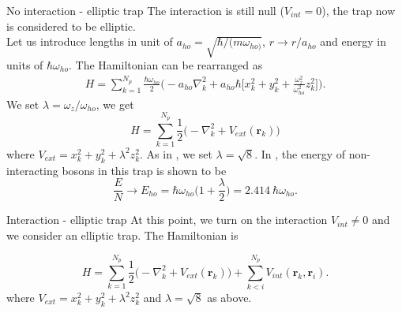 \documentclass[10pt]{beamer}
\begin{document}
\begin{frame}[fragile]{No interaction - elliptic trap}
	The interaction is still null ($V_{int}=0$), the trap now is considered to be elliptic.\\
	Let us introduce lengths in unit of $a_{ho}=\sqrt{\hbar/(m\omega_{ho)}}$, $r\rightarrow r/a_{ho}$ and energy in units of $\hbar\omega_{ho}$. The Hamiltonian can be rearranged as 
	\begin{equation*}
	\begin{split}
	H=\sum_{k=1}^{N_p}\frac{\hbar \omega_{ho}}{2}\bigg(-a_{ho}\nabla^2_{k}+a_{ho}{\hbar}\bigg[x^2_k+y^2_k+\frac{\omega^{2}_{z}}{\omega^{2}_{ho}}z^2_k\bigg]\bigg).
	\end{split}
	\end{equation*}
	We set $\lambda=\omega_z/\omega_{ho}$, we get
	\begin{equation}
	\label{ham}
	H=\sum_{k=1}^{N_p}\frac{1}{2}\bigg(-\nabla^2_{k}+V_{ext}(\mathbf{r}_k)\bigg)
	\end{equation}
	where $V_{ext}=x^2_k+y^2_k+\lambda^2 z^2_k$. As in \cite{DalfString}, we set $\lambda=\sqrt{8}$. In \cite{vmcarticle}, the energy of non-interacting bosons in this trap is shown to be
	\begin{equation*}
	\frac{E}{N}\rightarrow E_{ho}=\hbar\omega_{ho}\bigg(1+\frac{\lambda}{2}\bigg)=2.414\ \hbar\omega_{ho}.
	\end{equation*}
\end{frame}


\begin{frame}[fragile]{Interaction - elliptic trap}
At this point, we turn on the interaction $V_{int}\neq 0$ and we consider an elliptic trap. The Hamiltonian is

\begin{equation}
\label{ham2}
H=\sum_{k=1}^{N_p}\frac{1}{2}\bigg(-\nabla^2_{k}+V_{ext}(\mathbf{r}_k)\bigg)+\sum_{k<i}^{N_p} V_{int}(\mathbf{r}_k,\mathbf{r}_i).
\end{equation}
where $V_{ext}=x^2_k+y^2_k+\lambda^2 z^2_k$ and $\lambda=\sqrt{8}$ as above.	
\end{frame}




\end{document}
